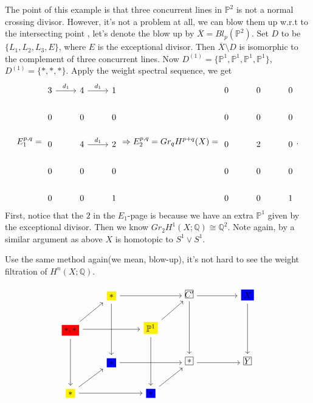 \documentclass[../main.tex]{subfiles}
\begin{document}
\begin{example}
The point of this example is that three concurrent lines in $\mathbb{P}^{2}$ is not a normal crossing divisor. However, it's not a problem at all, we can blow them up w.r.t to the intersecting point , let's denote the blow up by $\overline{X}=Bl_{p}(\mathbb{P}^{2})$. Set $D$ to be $\{L_{1}, L_{2}, L_{3}, E\}$, where $E$ is the exceptional divisor. Then $\overline{X}\setminus D$ is isomorphic to the complement of three concurrent lines. Now $D^{(1)}=\{\mathbb{P}^{1},\mathbb{P}^{1},\mathbb{P}^{1},\mathbb{P}^{1}\}$, $D^{(1)}=\{*, *, *\}$. Apply the weight spectral sequence, we get 
$$
E_{1}^{p,q}=\begin{tikzcd}
3 \arrow{r}{d_{1}}&4\arrow{r}{d_{1}} & 1\\
0 &0 & 0\\
0 &4 \arrow{r}{d_{1}}& 2\\
0 &0 & 0\\
0 &0 & 1\end{tikzcd}\Rightarrow E_{2}^{p,q}=Gr_{q}H^{p+q}(X)=\begin{tikzcd}
0 &0 & 0\\
0 &0 & 0\\
0 &2 & 0\\
0 &0 & 0\\
0 &0 & 1\end{tikzcd}.$$
First, notice that the $2$ in the $E_{1}$-page is because we have an extra $\mathbb{P}^{1}$ given by the exceptional divisor. Then we know $Gr_{2}H^{1}(X;\mathbb{Q})\cong \mathbb{Q}^{2}$. Note again, by a similar argument as above $X$ is homotopic to $S^{1}\vee S^{1}$.
\end{example}
\begin{remark}[$X=\mathbb{C}^{2}\setminus\{0\}\subset \mathbb{P}^{2}$]
Use the same method again(we mean, blow-up), it's not hard to see the weight filtration of $H^{n}(X;\mathbb{Q})$.
\end{remark}

\begin{example}
$$
\begin{tikzcd}
& \colorbox{yellow}{$*$}\arrow{rr}\arrow{dd}& &\framebox(9,9){$C'$}\arrow{rr}\arrow{dd} & & \colorbox{blue}{$X$}\arrow{dd}\\
\colorbox{red}{$*, * $}\arrow{rr}\arrow{dd}\arrow{ur}& &\colorbox{yellow}{$\mathbb{P}^{1}$}\arrow{ur}\arrow{dd} & & &\\
& \colorbox{blue}{$*$}\arrow{rr}&  & \framebox(9,9){$*$}\arrow{rr} & & \framebox(9,9){$Y$}\\
\colorbox{yellow}{$*$} \arrow{rr}\arrow{ur}& &\colorbox{blue}{$*$} \arrow{ur} & & &\\
\end{tikzcd}
$$
\end{example}
\end{document}
